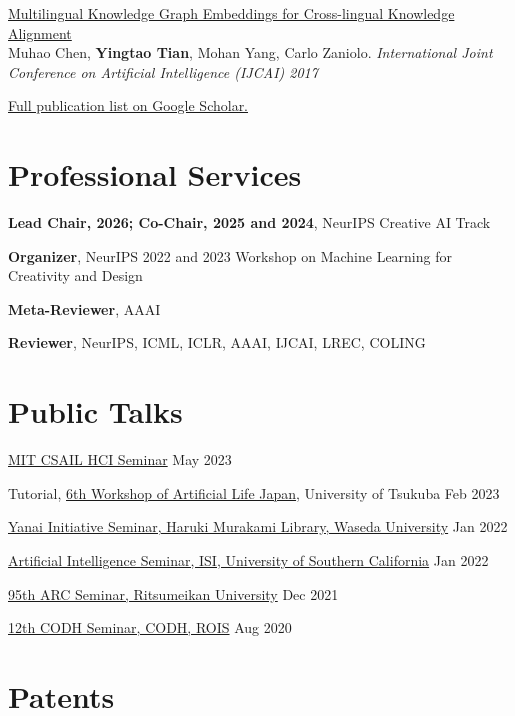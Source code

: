 \documentclass[line,margin]{cv}
\newcommand{\myemph}{\textbf}
\begin{document}
\begin{resume}
{  \begin{samepage}
  \href{https://arxiv.org/abs/1611.03954}{Multilingual Knowledge Graph Embeddings for Cross-lingual Knowledge Alignment}\\
  Muhao Chen, \textbf{Yingtao Tian}, Mohan Yang, Carlo Zaniolo. \emph{International Joint Conference on Artificial Intelligence (IJCAI) 2017}
  \par\end{samepage}

}

\href{https://scholar.google.com/citations?user=17Fe5K0AAAAJ}{Full publication list on Google Scholar.}

\section{Professional Services}
  \myemph{Lead Chair, 2026; Co-Chair, 2025 and 2024}, NeurIPS Creative AI Track

  \myemph{Organizer}, NeurIPS 2022 and 2023 Workshop on Machine Learning for Creativity and Design

  \myemph{Meta-Reviewer}, AAAI

  \myemph{Reviewer}, NeurIPS, ICML, ICLR, AAAI, IJCAI, LREC, COLING

\section{Public Talks}
  \href{https://calendar.csail.mit.edu/seminar_series/11195}{MIT CSAIL HCI Seminar} \hfill May 2023

  Tutorial, \href{https://alife-japan.org/archives/event/workshop006}{6th Workshop of Artificial Life Japan}, University of Tsukuba \hfill Feb 2023

  \href{https://www.waseda.jp/culture/wihl/other-en/1462}{Yanai Initiative Seminar, Haruki Murakami Library, Waseda University} \hfill Jan 2022

  \href{https://www.isi.edu/events/1080/understanding-japanese-humanities-through-the-lens-of-machine-intelligence/}{Artificial Intelligence Seminar, ISI, University of Southern California} \hfill Jan 2022

  \href{https://www.arc.ritsumei.ac.jp/e/news/pc/009275.html}{95th ARC Seminar, Ritsumeikan University} \hfill Dec 2021

  \href{http://codh.rois.ac.jp/seminar/ai-for-culture-20200805/}{12th CODH Seminar, CODH, ROIS} \hfill Aug 2020

\section{Patents}


\end{resume}
\end{document}

